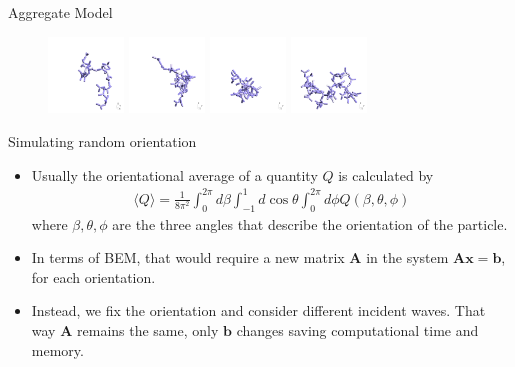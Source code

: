 \documentclass[12pt]{beamer}
\newcommand{\myfootnote}[1]{
    \renewcommand{\thefootnote}{}
    \footnotetext{\scriptsize#1}
    \renewcommand{\thefootnote}{\arabic{footnote}}
}
\begin{document}
\begin{frame}{Aggregate Model}
\begin{figure}
    \includegraphics[width = 0.18\textwidth]{Figures/aggregates/aggregate8582.png}
    \includegraphics[width = 0.18\textwidth]{Figures/aggregates/aggregate9200.png}
    \includegraphics[width = 0.18\textwidth]{Figures/aggregates/aggregate9594.png}
    \hfill
    \includegraphics[width = 0.18\textwidth]{Figures/aggregates/aggregate10235.png}
\end{figure}
\end{frame}

\begin{frame}{Simulating random orientation}
\myfootnote{\fullcite{draine2000user}}
\begin{itemize}
    \item Usually the orientational average of a quantity $Q$ is calculated by 
    \begin{align}
        \langle Q \rangle = \frac{1}{8\pi^2} \int_0^{2\pi} d \beta \int_{-1}^{1} d \cos \theta \int_0^{2\pi} d\phi Q(\beta, \theta, \phi) \nonumber 
    \end{align}
    where $\beta, \theta, \phi$ are the three angles that describe the orientation of the particle.
    \item In terms of BEM, that would require a new matrix $\mathbf{A}$ in the system $\mathbf{A} \mathbf{x} = \mathbf{b}$, for each orientation.
    \item Instead, we fix the orientation and consider different incident waves. That way $\mathbf{A}$ remains the same, only $\mathbf{b}$ changes saving computational time and memory.
\end{itemize}
\end{frame}
    
\end{document}

